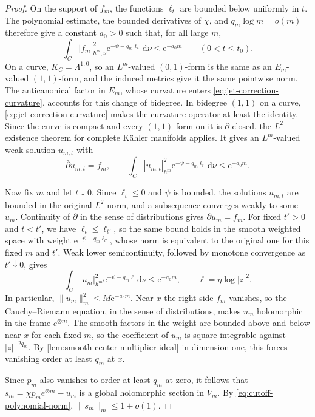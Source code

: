 \begin{proof}
On the support of $f_m$, the functions $\ell_t$ are bounded below uniformly in $t$. The polynomial estimate, the bounded derivatives of $\chi$, and $q_m\log m=o(m)$ therefore give a constant $a_0>0$ such that, for all large $m$,
\[
 \int_C|f_m|_{h^m,\nu}^2
        \mathrm{e}^{-\psi-q_m\ell_t}\,\mathrm{d}\nu
 \leq\mathrm{e}^{-a_0m}\qquad(0<t\leq t_0).
\]
On a curve, $K_C=\Lambda^{1,0}$, so an $L^m$-valued $(0,1)$-form is the same as an $E_m$-valued $(1,1)$-form, and the induced metrics give it the same pointwise norm. The anticanonical factor in $E_m$, whose curvature enters \eqref{eq:jet-correction-curvature}, accounts for this change of bidegree. In bidegree $(1,1)$ on a curve, \eqref{eq:jet-correction-curvature} makes the curvature operator at least the identity. Since the curve is compact and every $(1,1)$-form on it is $\bar\partial$-closed, the $L^2$ existence theorem for complete K\"ahler manifolds \cite[Theorem~5.1]{DemAM11} applies. It gives an $L^m$-valued weak solution $u_{m,t}$ with
\[
 \bar\partial u_{m,t}=f_m,\qquad
 \int_C|u_{m,t}|_{h^m}^2
       \mathrm{e}^{-\psi-q_m\ell_t}\,\mathrm{d}\nu
 \leq\mathrm{e}^{-a_0m}.
\]

Now fix $m$ and let $t\downarrow0$. Since $\ell_t\leq0$ and $\psi$ is bounded, the solutions $u_{m,t}$ are bounded in the original $L^2$ norm, and a subsequence converges weakly to some $u_m$. Continuity of $\bar\partial$ in the sense of distributions gives $\bar\partial u_m=f_m$. For fixed $t'>0$ and $t<t'$, we have $\ell_t\leq\ell_{t'}$, so the same bound holds in the smooth weighted space with weight $\mathrm{e}^{-\psi-q_m\ell_{t'}}$, whose norm is equivalent to the original one for this fixed $m$ and $t'$. Weak lower semicontinuity, followed by monotone convergence as $t'\downarrow0$, gives
\[
 \int_C|u_m|_{h^m}^2\mathrm{e}^{-\psi-q_m\ell}\,\mathrm{d}\nu
 \leq\mathrm{e}^{-a_0m},\qquad
 \ell=\eta\log|z|^2.
\]
In particular, $\|u_m\|_m^2\leq M\mathrm{e}^{-a_0m}$. Near $x$ the right side $f_m$ vanishes, so the Cauchy--Riemann equation, in the sense of distributions, makes $u_m$ holomorphic in the frame $e^{\otimes m}$. The smooth factors in the weight are bounded above and below near $x$ for each fixed $m$, so the coefficient of $u_m$ is square integrable against $|z|^{-2q_m}$. By \cref{lem:smooth-center-multiplier-ideal} in dimension one, this forces vanishing order at least $q_m$ at $x$.

Since $p_m$ also vanishes to order at least $q_m$ at zero, it follows that $s_m=\chi p_m e^{\otimes m}-u_m$ is a global holomorphic section in $V_m$. By \eqref{eq:cutoff-polynomial-norm}, $\|s_m\|_m\leq1+o(1)$.


\end{proof}
